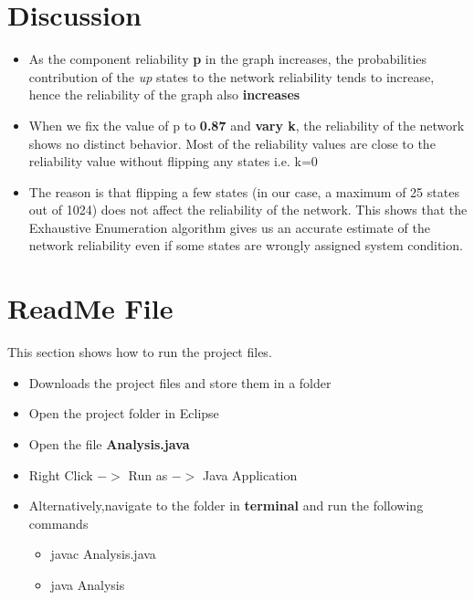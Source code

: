 \documentclass[12pt,letterpaper,titlepage,en-US]{article}
\begin{document}
\section{Discussion}
\begin{itemize}

\item As the component reliability \textbf{p} in the graph increases, the probabilities contribution of the \textit{up} states to the network reliability tends to increase, hence the reliability of the graph also \textbf{increases}

\item When we fix the value of p to \textbf{0.87} and \textbf{vary k}, the reliability of the network shows no distinct behavior. Most of the reliability values are close to the reliability value without flipping any states i.e. k=0

\item The reason is that flipping a few states (in our case, a maximum of 25 states out of 1024) does not affect the reliability of the network. This shows that the Exhaustive Enumeration algorithm gives us an accurate estimate of the network reliability even if some states are wrongly assigned system condition.


\end{itemize}





  \section{ReadMe File}
  This section shows how to run the project files.
  \begin{itemize}
  \item Downloads the project files and store them in a folder
  \item Open the project folder in Eclipse
  \item Open the file \textbf{Analysis.java}
  \item Right Click $->$ Run as $->$ Java Application
  \item Alternatively,navigate to the folder in \textbf{terminal} and run the following commands
  \begin{itemize}
  \item javac Analysis.java
  \item java Analysis
  \end{itemize}
  \end{itemize}
\end{document}
